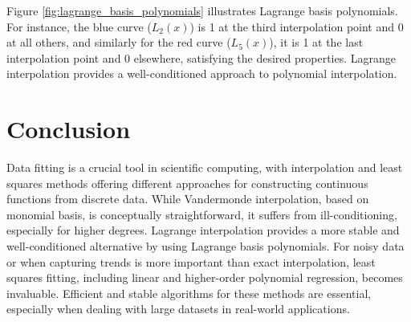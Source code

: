 \documentclass{article}
\begin{document}
Figure \ref{fig:lagrange_basis_polynomials} illustrates Lagrange basis polynomials. For instance, the blue curve ($L_2(x)$) is 1 at the third interpolation point and 0 at all others, and similarly for the red curve ($L_5(x)$), it is 1 at the last interpolation point and 0 elsewhere, satisfying the desired properties. Lagrange interpolation provides a well-conditioned approach to polynomial interpolation.

\section{Conclusion}

Data fitting is a crucial tool in scientific computing, with interpolation and least squares methods offering different approaches for constructing continuous functions from discrete data. While Vandermonde interpolation, based on monomial basis, is conceptually straightforward, it suffers from ill-conditioning, especially for higher degrees. Lagrange interpolation provides a more stable and well-conditioned alternative by using Lagrange basis polynomials. For noisy data or when capturing trends is more important than exact interpolation, least squares fitting, including linear and higher-order polynomial regression, becomes invaluable. Efficient and stable algorithms for these methods are essential, especially when dealing with large datasets in real-world applications.
\end{document}
